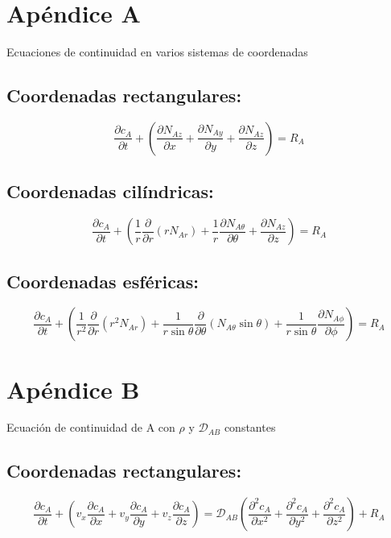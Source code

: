 \section{Apéndice A}
Ecuaciones de continuidad en varios sistemas de coordenadas

\subsection*{Coordenadas rectangulares:}
\begin{equation} \frac{\partial c_A}{\partial t} + \left( \frac{\partial N_{Az}}{\partial x} + \frac{\partial N_{Ay}}{\partial y} + \frac{\partial N_{Az}}{\partial z} \right) = R_A \tag{A}
\end{equation}

\subsection*{Coordenadas cilíndricas:}
\begin{equation} \frac{\partial c_A}{\partial t} + \left( \frac{1}{r} \frac{\partial}{\partial r} (rN_{Ar}) + \frac{1}{r} \frac{\partial N_{A\theta}}{\partial \theta} + \frac{\partial N_{Az}}{\partial z} \right) = R_A \tag{B} 
\end{equation}

\subsection*{Coordenadas esféricas:}
\begin{equation} \frac{\partial c_A}{\partial t} + \left( \frac{1}{r^2} \frac{\partial}{\partial r} (r^2 N_{Ar}) + \frac{1}{r \sin \theta} \frac{\partial}{\partial \theta} (N_{A\theta} \sin \theta) + \frac{1}{r \sin \theta} \frac{\partial N_{A\phi}}{\partial \phi} \right) = R_A \tag{C}
\end{equation}

\newpage
\section{Apéndice B}
Ecuación de continuidad de A con $\rho$ y $\mathcal{D}_{AB}$ constantes
\subsection*{Coordenadas rectangulares:}
\begin{equation}  \frac{\partial c_A}{\partial t} + \left( v_x \frac{\partial c_A}{\partial x} + v_y \frac{\partial c_A}{\partial y} + v_z \frac{\partial c_A}{\partial z} \right) = \mathcal{D}_{AB} \left( \frac{\partial^2 c_A}{\partial x^2} + \frac{\partial^2 c_A}{\partial y^2} + \frac{\partial^2 c_A}{\partial z^2} \right) + R_A \tag{A}
\end{equation}

